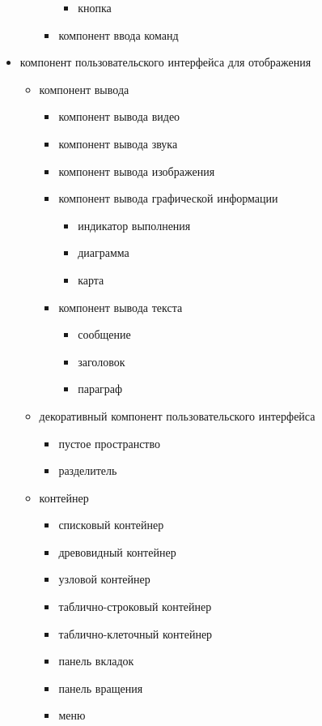 \begin{itemize}
\begin{itemize}
\begin{itemize}
\begin{itemize}
				\item кнопка
			\end{itemize}
			\item компонент ввода команд
		\end{itemize}
	\end{itemize}
	\item компонент пользовательского интерфейса для отображения
	\begin{itemize}
		\item компонент вывода
		\begin{itemize}
			\item компонент вывода видео
			\item компонент вывода звука
			\item компонент вывода изображения
			\item компонент вывода графической информации
			\begin{itemize}
				\item индикатор выполнения
				\item диаграмма
				\item карта
			\end{itemize}
			\item компонент вывода текста
			\begin{itemize}
				\item сообщение
				\item заголовок
				\item параграф
			\end{itemize}
		\end{itemize}
		\item декоративный компонент пользовательского интерфейса
		\begin{itemize}
			\item пустое пространство
			\item разделитель
		\end{itemize}
		\item контейнер
		\begin{itemize}
			\item списковый контейнер
			\item древовидный контейнер
			\item узловой контейнер
			\item таблично-строковый контейнер
			\item таблично-клеточный контейнер
			\item панель вкладок
			\item панель вращения
			\item меню

\end{itemize}
\end{itemize}
\end{itemize}
